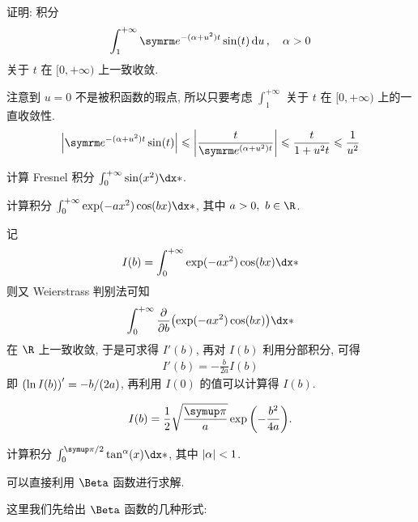 \begin{exercise}[series=exer]
  \item 证明: 积分
  \begin{align*}
      \int_{1}^{+\infty} \me^{-(\alpha + u^{2})t} \sin(t) \dd{u},\quad \alpha > 0
  \end{align*}
  关于 $ t $ 在 $ [0, +\infty) $ 上一致收敛.
  \begin{hint}
    注意到 $ u = 0 $ 不是被积函数的瑕点, 所以只要考虑 $ \int_{1}^{+\infty} $ 关于 $ t $ 在 $ [0, +\infty) $ 上的一直收敛性. 
      \begin{align*}
          \abs{\me^{-(\alpha + u^{2})t} \sin(t)} \le \abs{\frac{t}{\me^{(\alpha + u^{2})t}}} \le \frac{t}{1 + u^{2}t} \le \frac{1}{u^{2}}
      \end{align*}
  \end{hint}

  \hitem 计算 Fresnel 积分 $ \int_{0}^{+\infty} \sin(x^{2}) \dx* $.
  \item 计算积分 $ \int_{0}^{+\infty} \exp(-a x^{2})\cos(bx) \dx* $, 其中 $ a > 0,\ b\in \R $.
  \begin{hint}
      记
      \begin{align*}
          I(b) = \int_{0}^{+\infty} \exp(-a x^{2})\cos(bx) \dx*
      \end{align*}
      则又 Weierstrass 判别法可知
      \begin{align*}
          \int_{0}^{+\infty} \pdv{b}\qty(\exp(-a x^{2})\cos(bx)) \dx*
      \end{align*}
      在 $ \R $ 上一致收敛, 于是可求得 $ I'(b) $, 再对 $ I(b) $ 利用分部积分, 可得
      \begin{align*}
          I'(b) = -\frac{b}{2a}I(b)
      \end{align*}
      即 $ \qty(\ln I(b))' = -b/(2a) $, 再利用 $ I(0) $ 的值可以计算得 $ I(b) $.
  \end{hint}
  \begin{answer}
      \begin{align*}
          I(b) = \frac{1}{2}\sqrt{\frac{\pi}{a}}\exp\qty(-\frac{b^{2}}{4a}).
      \end{align*}
  \end{answer}
  \item 计算积分 $ \int_{0}^{\pi/2} \tan^{\alpha}(x) \dx* $, 其中 $ \abs{\alpha} < 1 $.
  \begin{hint}
      可以直接利用 $ \Beta $ 函数进行求解.
  \end{hint}
  \begin{answer}
      这里我们先给出 $ \Beta $ 函数的几种形式:
      \begin{align*}

\end{align*}
\end{answer}
\end{exercise}
